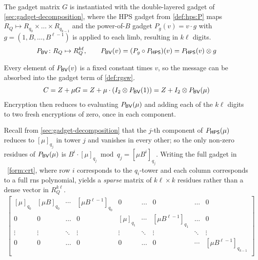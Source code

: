 The gadget matrix $G$ is instantiated with the double-layered gadget of \autoref{sec:gadget-decomposition}, where the HPS gadget from \eqref{def:hps:P} maps $R_Q \mapsto R_{q_0}\times\dots\times R_{q_{k-1}}$ and the power-of-$B$ gadget $P_g(v) = v\cdot g$ with $g = (1, B, \dots, B^{\ell-1})$ is applied to each limb, resulting in $k\ell$ digits.
\begin{equation}
    \label{def:bv:P}
    {P}_{\mathsf{BV}}\colon R_Q \mapsto R_Q^{k\ell}, \qquad {P}_{\mathsf{BV}}(v) = (P_g \circ {P}_{\mathsf{HPS}})(v) = {P}_{\mathsf{HPS}}(v) \otimes g
\end{equation}

Every element of ${P}_{\mathsf{BV}}(v)$ is a fixed constant times $v$, so the message can be absorbed into the gadget term of \eqref{def:rgsw}.
\begin{equation}
    \label{eq:hps:ciphertext}
    C = Z + \mu G = Z + \mu\cdot(I_2\otimes {P}_{\mathsf{BV}}(1)) = Z + I_2\otimes {P}_{\mathsf{BV}}(\mu)
\end{equation}
Encryption then reduces to evaluating ${P}_{\mathsf{BV}}(\mu)$ and adding each of the $k\ell$ digits to two fresh encryptions of zero, once in each component.

Recall from \autoref{sec:gadget-decomposition} that the $j$-th component of ${P}_{\mathsf{HPS}}(\mu)$ reduces to $[\mu]_{q_j}$ in tower $j$ and vanishes in every other; so the only non-zero residues of ${P}_{\mathsf{BV}}(\mu)$ is $B^i\cdot[\mu ]_{q_j} \bmod q_j = [\mu B^i]_{q_j}$. Writing the full gadget in \firstForm~\eqref{form:crt}, where row $i$ corresponds to the $q_i$-tower and each column corresponds to a full \gls{rns} polynomial, yields a \textit{sparse} matrix of $k\ell\times k$ residues rather than a dense vector in $R_Q^{k\ell}$.
\begin{gather*}
    \left[ \begin{array}{ccccccccc}
        [\mu]_{q_0} & [\mu B]_{q_0} & \cdots & [\mu B^{\ell -1 }]_{q_0} & 0 & \dots & 0 & \dots & 0 \\
        0 & 0 &  \dots & 0 &[\mu]_{q_1} & \cdots & [\mu B^{\ell -1 }]_{q_{1}} &  \dots & 0 \\
        \vdots & \vdots & \ddots & \vdots & \vdots & \ddots & \vdots & \ddots & \vdots \\
        0 & 0 & \dots & 0 & 0 & \dots & 0 & \cdots & [\mu B^{\ell -1 }]_{q_{k-1}}  \\
    \end{array} \right]%
\end{gather*}

